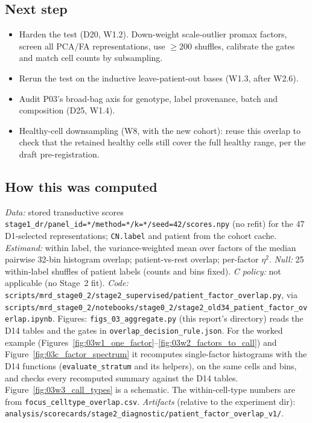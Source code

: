 \subsection*{Next step}
\begin{itemize}
\item Harden the test (D20, W1.2). Down-weight scale-outlier promax factors, screen all PCA/FA representations, use $\geq 200$ shuffles, calibrate the gates and match cell counts by subsampling.
\item Rerun the test on the inductive leave-patient-out bases (W1.3, after W2.6).
\item Audit P03's broad-bag axis for genotype, label provenance, batch and composition (D25, W1.4).
\item Healthy-cell downsampling (W8, with the new cohort): reuse this overlap to check that the retained healthy cells still cover the full healthy range, per the draft pre-registration.
\end{itemize}

\subsection*{How this was computed}
{\small\raggedright
\emph{Data:} stored transductive scores \nolinkurl{stage1_dr/panel_id=*/method=*/k=*/seed=42/scores.npy} (no refit) for the 47 D1-selected representations; \texttt{CN.label} and patient from the cohort cache. \emph{Estimand:} within label, the variance-weighted mean over factors of the median pairwise 32-bin histogram overlap; patient-vs-rest overlap; per-factor $\eta^2$. \emph{Null:} 25 within-label shuffles of patient labels (counts and bins fixed). \emph{C policy:} not applicable (no Stage~2 fit). \emph{Code:} \nolinkurl{scripts/mrd_stage0_2/stage2_supervised/patient_factor_overlap.py}, via \nolinkurl{scripts/mrd_stage0_2/notebooks/stage0_2/stage2_old34_patient_factor_overlap.ipynb}. Figures: \nolinkurl{figs_03_aggregate.py} (this report's directory) reads the D14 tables and the gates in \nolinkurl{overlap_decision_rule.json}. For the worked example (Figures~\ref{fig:03w1_one_factor}--\ref{fig:03w2_factors_to_call}) and Figure~\ref{fig:03c_factor_spectrum} it recomputes single-factor histograms with the D14 functions (\texttt{evaluate\_stratum} and its helpers), on the same cells and bins, and checks every recomputed summary against the D14 tables. Figure~\ref{fig:03w3_call_types} is a schematic. The within-cell-type numbers are from \nolinkurl{focus_celltype_overlap.csv}. \emph{Artifacts} (relative to the experiment dir): \nolinkurl{analysis/scorecards/stage2_diagnostic/patient_factor_overlap_v1/}. \par}
